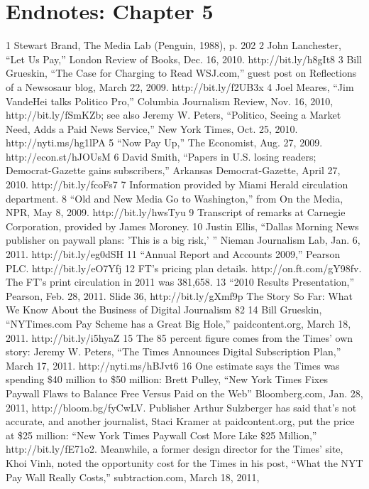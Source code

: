 \section{Endnotes: Chapter 5}
1 Stewart Brand, The Media Lab (Penguin, 1988), p. 202
2 John Lanchester, ``Let Us Pay,'' London Review of Books, Dec. 16, 2010. http://bit.ly/h8gIt8
3 Bill Grueskin, ``The Case for Charging to Read WSJ.com,'' guest post on Reflections of a
Newsosaur blog, March 22, 2009. http://bit.ly/f2UB3x
4 Joel Meares, ``Jim VandeHei talks Politico Pro,'' Columbia Journalism Review, Nov. 16, 2010,
http://bit.ly/fSmKZb; see also Jeremy W. Peters, ``Politico, Seeing a Market Need, Adds a Paid
News Service,'' New York Times, Oct. 25, 2010. http://nyti.ms/hg1lPA
5 ``Now Pay Up,'' The Economist, Aug. 27, 2009. http://econ.st/hJOUsM
6 David Smith, ``Papers in U.S. losing readers; Democrat-Gazette gains subscribers,''
Arkansas Democrat-Gazette, April 27, 2010. http://bit.ly/fcoFs7
7 Information provided by Miami Herald circulation department.
8 ``Old and New Media Go to Washington,'' from On the Media, NPR, May 8, 2009.
http://bit.ly/hwsTyu
9 Transcript of remarks at Carnegie Corporation, provided by James Moroney.
10 Justin Ellis, ``Dallas Morning News publisher on paywall plans: 'This is a big risk,' '' Nieman
Journalism Lab, Jan. 6, 2011. http://bit.ly/eg0dSH
11 ``Annual Report and Accounts 2009,'' Pearson PLC. http://bit.ly/eO7Yfj
12 FT's pricing plan details. http://on.ft.com/gY98fv. The FT's print circulation in 2011
was 381,658.
13 ``2010 Results Presentation,'' Pearson, Feb. 28, 2011. Slide 36, http://bit.ly/gXmf9p
The Story So Far: What We Know About the Business of Digital Journalism
82
14 Bill Grueskin, ``NYTimes.com Pay Scheme has a Great Big Hole,'' paidcontent.org,
March 18, 2011. http://bit.ly/i5hyaZ
15 The 85 percent figure comes from the Times' own story: Jeremy W. Peters, ``The Times
Announces Digital Subscription Plan,'' March 17, 2011. http://nyti.ms/hBJvt6
16 One estimate says the Times was spending \$40 million to \$50 million: Brett Pulley, ``New
York Times Fixes Paywall Flaws to Balance Free Versus Paid on the Web'' Bloomberg.com,
Jan. 28, 2011, http://bloom.bg/fyCwLV. Publisher Arthur Sulzberger has said that's not
accurate, and another journalist, Staci Kramer at paidcontent.org, put the price at \$25 million:
``New York Times Paywall Cost More Like \$25 Million,'' http://bit.ly/fE71o2. Meanwhile,
a former design director for the Times' site, Khoi Vinh, noted the opportunity cost for the
Times in his post, ``What the NYT Pay Wall Really Costs,'' subtraction.com, March 18, 2011,
